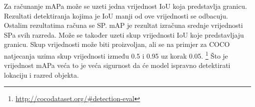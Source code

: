 Za računanje mAPa može se uzeti jedna vrijednost IoU koja predstavlja granicu. Rezultati detektiranja kojima je IoU manji od ove vrijednosti se odbacuju.
Ostalim rezultatima računa se SP. mAP je rezultat izračuna srednje vrijednosti SPa svih razreda. Može se također uzeti skup vrijednosti IoU koje predstavljaju granicu. 
Skup vrijednosti može biti proizvoljan, ali se na primjer za COCO natjecanja uzima skup vrijednosti između 0.5 i 0.95 uz korak 0.05. \footnote{\url{http://cocodataset.org/\#detection-eval}}
Što je vrijednost mAPa veća to je veća sigurnost da će model ispravno detektirati lokaciju i razred objekta. 